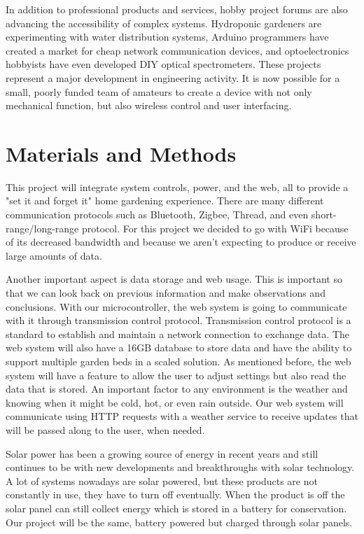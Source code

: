 \documentclass[journal]{IEEEtran}
\begin{document}
In addition to professional products and services, hobby project forums are also advancing the
accessibility of complex systems. Hydroponic gardeners are experimenting with water distribution systems,
Arduino programmers have created a market for cheap network communication devices, and optoelectronics
hobbyists have even developed DIY optical spectrometers\cite{Cao}. These projects represent a major development in
engineering activity. It is now possible for a small, poorly funded team of amateurs to create a device
with not only mechanical function, but also wireless control and user interfacing. 

\section{Materials and Methods}

This project will integrate system controls, power, and the web, all to provide 
a "set it and forget it" home gardening experience. There are many different communication protocols
such as Bluetooth, Zigbee, Thread, and even short-range/long-range protocol. For this project we
decided to go with WiFi because of its decreased bandwidth and because we aren't expecting to produce or
receive large amounts of data. 

Another important aspect is data storage and web usage. This is important so 
that we can look back on previous information and make observations and conclusions. With our 
microcontroller, the web system is going to communicate with it through transmission control protocol.
Transmission control protocol is a standard to establish and maintain a network connection to 
exchange data. The web system will also have a 16GB database to store data and have the ability to support 
multiple garden beds in a scaled solution. As mentioned before, the web system will have a feature to 
allow the user to adjust settings but also read the data that is stored. An important factor to any 
environment is the weather and knowing when it might be cold, hot, or even rain outside. Our web system 
will communicate using HTTP requests with a weather service to receive updates that will be passed along 
to the user, when needed.

Solar power has been a growing source of energy in recent years and still continues to be with new 
developments and breakthroughs with solar technology. A lot of systems nowadays are solar powered, but 
these products are not constantly in use, they have to turn off eventually. When the product is off the 
solar panel can still collect energy which is stored in a battery for conservation. Our project will be 
the same, battery powered but charged through solar panels.
\end{document}

